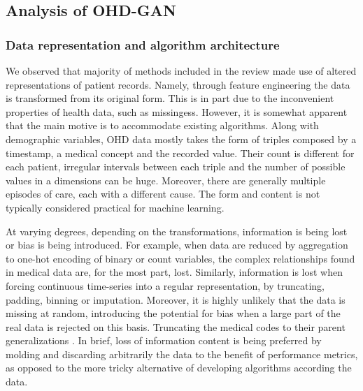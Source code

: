 \subsection{Analysis of OHD-GAN}
\subsubsection{Data representation and algorithm architecture}
We observed that majority of methods included in the review made use of  altered representations of patient records. Namely, through feature engineering the data is transformed from its original form. This is in part due to the inconvenient properties of health data, such as missingess. However, it is somewhat apparent that the main motive is to accommodate existing algorithms. Along with demographic variables, OHD data mostly takes the form of triples composed by a timestamp, a medical concept and the recorded value. Their count is different for each patient, irregular intervals between each triple and the number of possible values in a dimensions can be huge. Moreover, there are generally multiple episodes of care, each with a different cause. The form and content is not typically considered practical for machine learning. \par
At varying degrees, depending on the transformations, information is being lost or bias is being  introduced. For example, when data are reduced by aggregation to one-hot encoding of binary or count variables, the complex relationships found in medical data are, for the most part, lost. Similarly, information is lost when forcing continuous time-series into a regular representation, by truncating, padding, binning or imputation. Moreover, it is highly unlikely that the data is missing at random, introducing the potential for bias when a large part of the real data is rejected on this basis. Truncating the medical codes to their parent generalizations \cite{Zhang2020, Choi2017-nt}.  In brief, loss of information content is being preferred by molding and discarding arbitrarily the data to the benefit of performance metrics, as opposed to the more tricky alternative of developing algorithms according the data.\par

